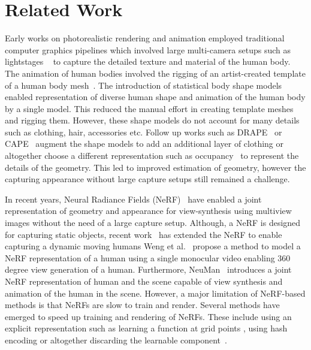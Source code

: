 \section{Related Work}

Early works on photorealistic rendering and animation employed traditional computer graphics pipelines which involved large multi-camera setups such as lightstages ~\cite{debevec2012light} to capture the detailed texture and material of the human body. The animation of human bodies involved the rigging of an artist-created template of a human body mesh~\cite{alexander2013digitalira, alexander2010emily}. The introduction of statistical body shape models~\cite{anguelov2005scape, SMPL:2015, pavlakos2019smplx, STAR:ECCV:2020, SUPR} enabled representation of diverse human shape and animation of the human body by a single model. This reduced the manual effort in creating template meshes and rigging them.
However, these shape models do not account for many details such as clothing, hair, accessories etc. Follow up works such as DRAPE~\cite{drape2012guan} or CAPE~\cite{ma2020cape} augment the shape models to add an additional layer of clothing or altogether choose a different representation such as occupancy~\cite{saito2019pifu, saito2020pifuhd, chen2021snarf, xiu2023econ, xiu2022icon} to represent the details of the geometry. This led to improved estimation of geometry, however the capturing appearance without large capture setups still remained a challenge.

In recent years, Neural Radiance Fields (NeRF)~\cite{mildenhall2020nerf} have enabled a joint representation of geometry and appearance for view-synthesis using multiview images without the need of a large capture setup. Although, a NeRF is designed for capturing static objects, recent work~\cite{peng2021neuralbody, weng2020vid2actor, liu2021neuralactor, weng2022humannerf, jiang2022neuman, Su21arxiv_A_NeRF, guo2023vid2avatar, Feng2022scarf,Mihajlovic:KeypointNeRF:ECCV2022} has extended the NeRF to enable capturing a dynamic moving humans
Weng et al.~\cite{weng2022humannerf} propose a method to model a NeRF representation of a human using a single monocular video enabling 360 degree view generation of a human. Furthermore, NeuMan~\cite{jiang2022neuman} introduces a joint NeRF representation of human and the scene capable of view synthesis and animation of the human in the scene. However, a major limitation of NeRF-based methods is that NeRFs are slow to train and render. Several methods have emerged to speed up training and rendering of NeRFs. These include using an explicit representation such as learning a function at grid points \cite{chen2022tensorf, reiser2021kilonerf}, using hash encoding \cite{muller2022instantngp} or altogether discarding the learnable component~\cite{fridovich2022plenoxels,liu2020neural}. 

